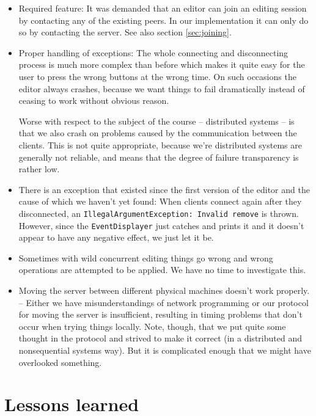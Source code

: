 \documentclass[a4paper,final,12pt,oneside,article,table]{memoir}
\newcommand{\mil}[1]{\texttt{#1}}
\begin{document}
\begin{itemize}
\item Required feature: It was demanded that an editor can join an
    editing session by contacting any of the existing peers. In our
    implementation it can only do so by contacting the server. See also
    section \ref{sec:joining}.

\item Proper handling of exceptions: The whole connecting and
    disconnecting process is much more complex than before which makes
    it quite easy for the user to press the wrong buttons at the wrong
    time. On such occasions the editor always crashes, because we want
    things to fail dramatically instead of ceasing to work without
    obvious reason.
    
    Worse with respect to the subject of the course – distributed
    systems – is that we also crash on problems caused by the
    communication between the clients.  This is not quite appropriate,
    because we're distributed systems are generally not reliable, and
    means that the degree of failure transparency is rather low.

\item There is an exception that existed since the first version of the
    editor and the cause of which we haven't yet found: When clients
    connect again after they disconnected, an
    \mil{IllegalArgumentException: Invalid remove} is thrown. However,
    since the \mil{EventDisplayer} just catches and prints it and it
    doesn't appear to have any negative effect, we just let it be.

\item Sometimes with wild concurrent editing things go wrong and wrong
    operations are attempted to be applied. We have no time to
    investigate this.

\item Moving the server between different physical machines doesn't work
    properly. – Either we have misunderstandings of network programming
    or our protocol for moving the server is insufficient, resulting in
    timing problems that don't occur when trying things locally. Note,
    though, that we put quite some thought in the protocol and strived
    to make it correct (in a distributed and nonsequential systems way).
    But it is complicated enough that we might have overlooked
    something.
\end{itemize}

\chapter{Lessons learned}
\end{document}
